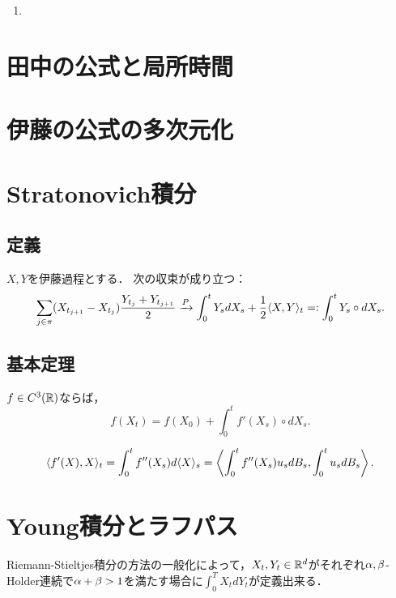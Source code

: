 \documentclass[uplatex,dvipdfmx]{jsreport}
\begin{document}
\begin{example}[種々の公式]\mbox{}
    \begin{enumerate}
        \item 
    \end{enumerate}
\end{example}

\section{田中の公式と局所時間}

\section{伊藤の公式の多次元化}

\section{Stratonovich積分}

\subsection{定義}

\begin{proposition}
    $X,Y$を伊藤過程とする．
    次の収束が成り立つ：
    \[\sum_{j\in\pi}(X_{t_{j+1}}-X_{t_j})\frac{Y_{t_j}+Y_{t_{j+1}}}{2}\xrightarrow{P}\int^t_0Y_sdX_s+\frac{1}{2}\langle X,Y\rangle_t=:\int^t_0Y_s\circ dX_s.\]
\end{proposition}

\subsection{基本定理}

\begin{proposition}
    $f\in C^3(\mathbb{R})$ならば，
    \[f(X_t)=f(X_0)+\int^t_0f'(X_s)\circ dX_s.\]
\end{proposition}

\begin{corollary}
    \[\langle f'(X),X\rangle_t=\int^t_0f''(X_s)d\langle X\rangle_s=\left\langle\int^t_0f''(X_s)u_sdB_s,\int^t_0u_sdB_s\right\rangle.\]
\end{corollary}

\section{Young積分とラフパス}

\begin{tcolorbox}[colframe=ForestGreen, colback=ForestGreen!10!white,breakable,colbacktitle=ForestGreen!40!white,coltitle=black,fonttitle=\bfseries\sffamily,
title=]
    Riemann-Stieltjes積分の方法の一般化によって，$X_t,Y_t\in\mathbb{R}^d$がそれぞれ$\alpha,\beta$-Holder連続で$\alpha+\beta>1$を満たす場合に$\int^T_0X_tdY_t$が定義出来る．
\end{tcolorbox}
\end{document}
